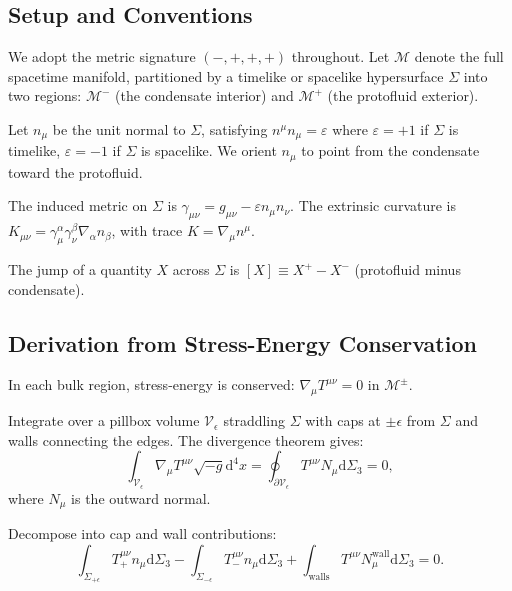 \documentclass[11pt,a4paper]{article}
\newcommand{\dx}{\mathrm{d}}
\theoremstyle{definition}
\begin{document}
\subsection{Setup and Conventions}
\label{app:RH_setup}

We adopt the metric signature $(-,+,+,+)$ throughout. Let $\mathcal{M}$ denote the full spacetime manifold, partitioned by a timelike or spacelike hypersurface $\Sigma$ into two regions: $\mathcal{M}^{-}$ (the condensate interior) and $\mathcal{M}^{+}$ (the protofluid exterior).

Let $n_\mu$ be the unit normal to $\Sigma$, satisfying $n^\mu n_\mu = \varepsilon$ where $\varepsilon = +1$ if $\Sigma$ is timelike, $\varepsilon = -1$ if $\Sigma$ is spacelike. We orient $n_\mu$ to point from the condensate toward the protofluid.

The induced metric on $\Sigma$ is $\gamma_{\mu\nu} = g_{\mu\nu} - \varepsilon n_\mu n_\nu$. The extrinsic curvature is $K_{\mu\nu} = \gamma^\alpha_\mu \gamma^\beta_\nu \nabla_\alpha n_\beta$, with trace $K = \nabla_\mu n^\mu$.

The jump of a quantity $X$ across $\Sigma$ is $[X] \equiv X^{+} - X^{-}$ (protofluid minus condensate).

\subsection{Derivation from Stress-Energy Conservation}
\label{app:RH_derivation_main}

In each bulk region, stress-energy is conserved: $\nabla_\mu T^{\mu\nu} = 0$ in $\mathcal{M}^{\pm}$.

Integrate over a pillbox volume $\mathcal{V}_\epsilon$ straddling $\Sigma$ with caps at $\pm\epsilon$ from $\Sigma$ and walls connecting the edges. The divergence theorem gives:
\begin{equation}
\int_{\mathcal{V}_\epsilon} \nabla_\mu T^{\mu\nu} \sqrt{-g} \dx^4 x = \oint_{\partial \mathcal{V}_\epsilon} T^{\mu\nu} N_\mu \dx \Sigma_3 = 0,
\end{equation}
where $N_\mu$ is the outward normal.

Decompose into cap and wall contributions:
\begin{equation}
\int_{\Sigma_{+\epsilon}} T^{\mu\nu}_{+} n_\mu \dx \Sigma_3 - \int_{\Sigma_{-\epsilon}} T^{\mu\nu}_{-} n_\mu \dx \Sigma_3 + \int_{\text{walls}} T^{\mu\nu} N^{\text{wall}}_\mu \dx \Sigma_3 = 0.
\end{equation}
\end{document}
